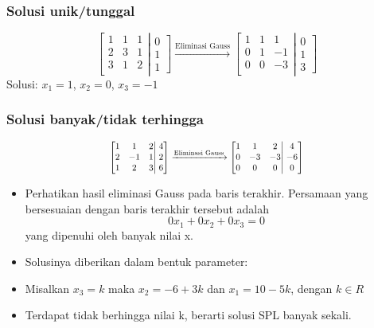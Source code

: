 \documentclass[pdflatex,compress,mathserif]{beamer}
\newcommand*{\Scale}[2][4]{\scalebox{#1}{$#2$}}%
\begin{document}
\begin{frame}
	\frametitle{Solusi unik/tunggal}
	\[
	\left[
		\begin{matrix}
			1 & 1 & 1\\
			2 & 3 & 1\\
			3 & 1 & 2\\
		\end{matrix}
	\right|
	\left.
		\begin{matrix}
			0 \\ 1 \\ 1
		\end{matrix}
	\right]
	\xrightarrow{\text{Eliminasi Gauss}}
	\left[
		\begin{matrix}
			1 & 1 & 1\\
			0 & 1 & -1\\
			0 & 0 & -3\\
		\end{matrix}
	\right|
	\left.
		\begin{matrix}
			0 \\ 1 \\ 3
		\end{matrix}
	\right]
	\]
	Solusi: $ x_1 = 1 $, $ x_2 = 0 $, $ x_3 = -1 $
\end{frame}

\begin{frame}
	\frametitle{Solusi banyak/tidak terhingga}
	\[
	\Scale[0.8]{
	\left[
	\begin{matrix}
	1 & 1 & 2\\
	2 & -1 & 1\\
	1 & 2 & 3\\
	\end{matrix}
	\right|
	\left.
	\begin{matrix}
	4 \\ 2 \\ 6
	\end{matrix}
	\right]
	\xrightarrow{\text{Eliminasi Gauss}}
	\left[
	\begin{matrix}
	1 & 1 & 2\\
	0 & -3 & -3\\
	0 & 0 & 0\\
	\end{matrix}
	\right|
	\left.
	\begin{matrix}
	4 \\ -6 \\ 0
	\end{matrix}
	\right]
	}\]
	\begin{itemize}
		\item Perhatikan hasil eliminasi Gauss pada baris terakhir. Persamaan yang bersesuaian dengan baris terakhir tersebut adalah
		\[ 0x_1 + 0x_2 + 0x_3 = 0 \]
		yang dipenuhi oleh banyak nilai x.
		\item Solusinya diberikan dalam bentuk parameter:
		\item Misalkan $ x_3 = k $ maka $ x_2 = -6 + 3k $ dan $ x_1 = 10-5k $, dengan $ k \in R $
		\item Terdapat tidak berhingga nilai k, berarti solusi SPL banyak sekali.
	\end{itemize}
\end{frame}
\end{document}
